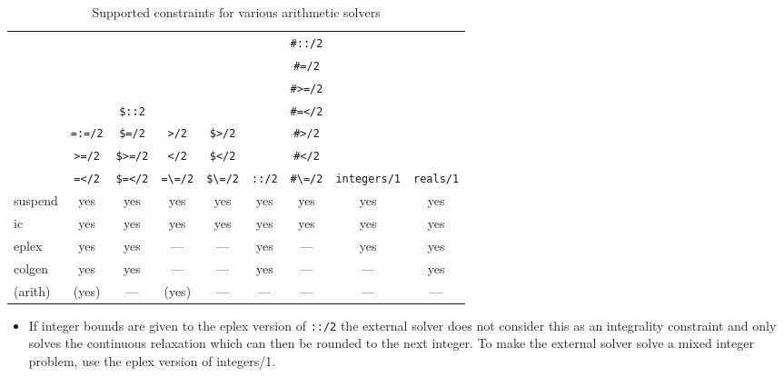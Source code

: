 \begin{table}
\begin{center}
\begin{toimage}
\begin{tabular}{|l||c|c|c|c|c|c|c|c|}
\hline
       &              &              &              &              &             & \verb'#::/2' &                   & \\
       &              &              &              &              &             & \verb'#=/2'  &                   & \\
       &              &              &              &              &             & \verb'#>=/2' &                   & \\
       &              & \verb'$::2'  &              &              &             & \verb'#=</2' &                   & \\
       & \verb'=:=/2' & \verb'$=/2'  & \verb'>/2'   & \verb'$>/2'  &             & \verb'#>/2'  &                   & \\
       & \verb'>=/2'  & \verb'$>=/2' & \verb'</2'   & \verb'$</2'  &             & \verb'#</2'  &                   & \\
       & \verb'=</2'  & \verb'$=</2' & \verb'=\=/2' & \verb'$\=/2' & \verb'::/2' & \verb'#\=/2' & \verb'integers/1' & \verb'reals/1' \\
\hline
\hline
suspend	& yes & yes & yes & yes & yes & yes & yes & yes \\
\hline                          
ic	& yes & yes & yes & yes & yes & yes & yes & yes \\
\hline                          
eplex	& yes & yes & --- & --- & yes & --- & yes & yes \\
\hline                          
colgen	& yes & yes & --- & --- & yes & --- & --- & yes \\
\hline                          
(arith)	&(yes)& --- &(yes)& --- & --- & --- & --- & --- \\
\hline
\end{tabular}
\end{toimage}\imageflush
\end{center}
{\small
    \begin{itemize}
    \item If integer bounds are given to the eplex version of \verb'::/2' 
    the external solver does not consider this as an integrality constraint
    and only solves the continuous relaxation which can then be rounded
    to the next integer.  To make the external solver solve a mixed
    integer problem, use the eplex version of integers/1.
    \end{itemize}
}
\caption{Supported constraints for various arithmetic solvers}
\label{commoncons}
\end{table}
